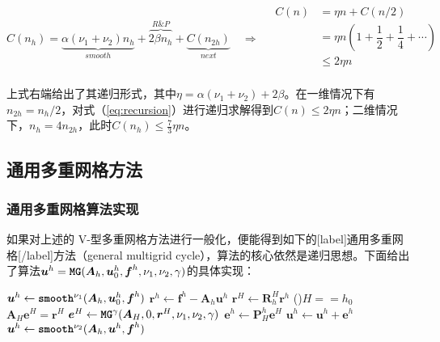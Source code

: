 \documentclass[12pt, UTF8, nofonts]{ctexart}
\begin{document}
\begin{equation}
  \label{eq:recursion}
  C(n_h) = \underbrace{\alpha(\nu_1+\nu_2)n_h}_{smooth} + \overbrace{2\beta n_h}^{R\&P} + \underbrace{C(n_{2h})}_{next} \quad\Rightarrow\quad
  \begin{aligned}
    C(n) &= \eta n + C(n/2) \\
    &= \eta n(1 + \dfrac{1}{2} + \dfrac{1}{4} + \cdots) \\
    &\leq 2\eta n \\
  \end{aligned}
\end{equation}

上式右端给出了其递归形式，其中$\eta=\alpha(\nu_1+\nu_2)+2\beta$。在一维情况下有$n_{2h}=n_h/2$，对式（\ref{eq:recursion}）进行递归求解得到$C(n)\leq2\eta n$；二维情况下，$n_h=4n_{2h}$，此时$C(n_h)\leq\frac{7}{3}\eta n$。



\subsection*{通用多重网格方法}

\subsubsection*{通用多重网格算法实现}

如果对上述的 V-型多重网格方法进行一般化，便能得到如下的[label]通用多重网格[/label]方法（general multigrid cycle），算法的核心依然是递归思想。下面给出了算法$\boldsymbol{u}^h = \textbf{\texttt{MG}}(\boldsymbol{A}_h,\boldsymbol{u}_0^h,\boldsymbol{f}^h,\nu_1,\nu_2,\gamma)$的具体实现：

\begin{algorithm}[H]
  $\boldsymbol{u}^h \gets \textbf{\texttt{smooth}}^{\nu_1}(\boldsymbol{A}_h,\boldsymbol{u}_{0}^h,\boldsymbol{f}^h)$
  $\boldsymbol{r}^h \gets \boldsymbol{f}^h - \boldsymbol{A}_h \boldsymbol{u}^h$
  $\boldsymbol{r}^{H} \gets \boldsymbol{R}_{h}^{H}\boldsymbol{r}^h$
  \eIf(){$H==h_0$}{
    $\boldsymbol{A}_{H} \boldsymbol{e}^{H} = \boldsymbol{r}^{H}$
  }{
    $\boldsymbol{e}^H \gets \textbf{\texttt{MG}}^{\gamma}(\boldsymbol{A}_H,0,\boldsymbol{r}^H,\nu_1,\nu_2,\gamma)$
  }
  $\boldsymbol{e}^h \gets \boldsymbol{P}_{H}^{h} \boldsymbol{e}^{H}$
  $\boldsymbol{u}^h \gets \boldsymbol{u}^h + \boldsymbol{e}^h$
  $\boldsymbol{u}^h \gets \textbf{\texttt{smooth}}^{\nu_2}(\boldsymbol{A}_h, \boldsymbol{u}^h, \boldsymbol{f}^h)$
\end{algorithm}
\end{document}
